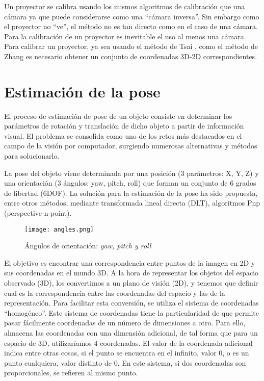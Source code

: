 Un proyector se calibra usando los mismos algoritmos de calibración que una cámara ya que puede considerarse como una ``cámara inversa''. Sin embargo como el proyector no ``ve'', el método no es tan directo como en el caso de una cámara. Para la calibración de un proyector es inevitable el uso al menos una cámara. Para calibrar un proyector, ya sea usando el método de Tsai \cite{Tsai}, como el método de Zhang \cite{Zhang99} es necesario obtener un conjunto de coordenadas 3D-2D correspondientes. 

\section{Estimación de la pose}
El proceso de estimación de pose de un objeto consiste en determinar los parámetros de rotación y translación de dicho objeto a partir de información visual. El problema se consolida como uno de los retos más destacados en el campo de la visión por computador, surgiendo numerosas alternativas y métodos para solucionarlo. 

La pose del objeto viene determinada por una posición (3 parámetros: X, Y, Z) y una orientación (3 ángulos: yaw, pitch, roll) que forman un conjunto de 6 grados de libertad (6DOF). La solución para la estimación de la pose ha sido propuesta, entre otros métodos, mediante transformada lineal directa (DLT), algoritmos Pnp (perspective-n-point).
\begin{figure}[h]
  \centering
  \texttt{[image: angles.png]}
  \caption{Ángulos de orientación: \emph{yaw, pitch y roll}}
  \label{fig:ángulos}
\end{figure}

El objetivo es encontrar una correspondencia entre puntos de la imagen en 2D y sus coordenadas en el mundo 3D. A la hora de representar los objetos del espacio observado (3D), los convertimos a un plano de visión (2D), y tenemos que definir cual es la correspondencia entre las coordenadas del espacio y las de la representación. Para facilitar esta conversión, se utiliza el sistema de coordenadas ``homogéneo''. Este sistema de coordenadas tiene la particularidad de que permite pasar fácilmente coordenadas de un número de dimensiones a otro. Para ello, almacena las coordenadas con una dimensión adicional, de tal forma que para un espacio de 3D, utilizaríamos 4 coordenadas. El valor de la coordenada adicional indica entre otras cosas, si el punto se encuentra en el infinito, valor 0, o es un punto cualquiera, valor distinto de 0. En este sistema, si dos coordenadas son proporcionales, se refieren al mismo punto.

